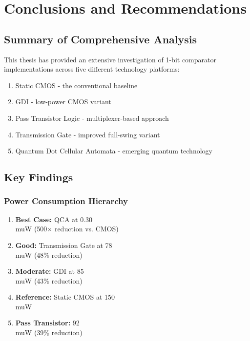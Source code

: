 \documentclass[12pt,a4paper,twoside]{report}
\begin{document}
\chapter{Conclusions and Recommendations}
\label{ch:conclusions}

\section{Summary of Comprehensive Analysis}

This thesis has provided an extensive investigation of 1-bit comparator implementations across five different technology platforms:

\begin{enumerate}
    \item Static CMOS - the conventional baseline
    \item GDI - low-power CMOS variant
    \item Pass Transistor Logic - multiplexer-based approach
    \item Transmission Gate - improved full-swing variant
    \item Quantum Dot Cellular Automata - emerging quantum technology
\end{enumerate}

\section{Key Findings}

\subsection{Power Consumption Hierarchy}

\begin{enumerate}
    \item \textbf{Best Case:} QCA at 0.30 \\muW (500× reduction vs. CMOS)
    \item \textbf{Good:} Transmission Gate at 78 \\muW (48\% reduction)
    \item \textbf{Moderate:} GDI at 85 \\muW (43\% reduction)
    \item \textbf{Reference:} Static CMOS at 150 \\muW
    \item \textbf{Pass Transistor:} 92 \\muW (39\% reduction)
\end{enumerate}
\end{document}
